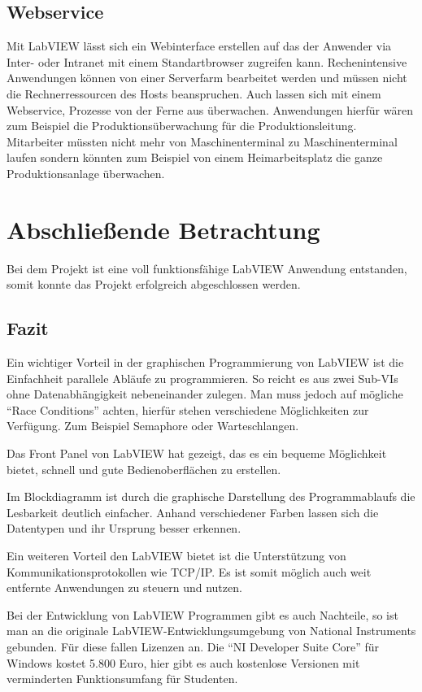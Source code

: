 \subsection{Webservice}
Mit LabVIEW lässt sich ein Webinterface erstellen auf das der Anwender via Inter- oder Intranet mit einem Standartbrowser zugreifen kann. Rechenintensive Anwendungen können von einer Serverfarm bearbeitet werden und müssen nicht die Rechnerressourcen des Hosts beanspruchen. Auch lassen sich mit einem Webservice, Prozesse von der Ferne aus überwachen. Anwendungen hierfür wären zum Beispiel die Produktionsüberwachung für die Produktionsleitung. Mitarbeiter müssten nicht mehr von Maschinenterminal zu Maschinenterminal laufen sondern könnten zum Beispiel von einem Heimarbeitsplatz die ganze Produktionsanlage überwachen.



\section{Abschließende Betrachtung}
Bei dem Projekt ist eine voll funktionsfähige LabVIEW Anwendung entstanden, somit konnte das Projekt erfolgreich abgeschlossen werden. 

\subsection{Fazit}
Ein wichtiger Vorteil in der graphischen Programmierung von LabVIEW ist die Einfachheit parallele Abläufe zu programmieren. So reicht es aus zwei Sub-VIs ohne Datenabhängigkeit nebeneinander zulegen. Man muss jedoch auf mögliche "`Race Conditions"' achten, hierfür stehen verschiedene Möglichkeiten zur Verfügung. Zum Beispiel Semaphore oder Warteschlangen. 

Das Front Panel von LabVIEW hat gezeigt, das es ein bequeme Möglichkeit bietet, schnell und gute Bedienoberflächen zu erstellen.

Im Blockdiagramm ist durch die graphische Darstellung des Programmablaufs die Lesbarkeit deutlich einfacher. Anhand verschiedener Farben lassen sich die Datentypen und ihr Ursprung besser erkennen.

Ein weiteren Vorteil den LabVIEW bietet ist die Unterstützung von Kommunikationsprotokollen wie TCP/IP. Es ist somit möglich auch weit entfernte Anwendungen zu steuern und nutzen.

Bei der Entwicklung von LabVIEW Programmen gibt es auch Nachteile, so ist man an die originale LabVIEW-Entwicklungsumgebung von National Instruments gebunden. Für diese fallen Lizenzen an. Die "`NI Developer Suite Core"' für Windows kostet 5.800 Euro, hier gibt es auch kostenlose Versionen mit verminderten Funktionsumfang für Studenten. \cite{ni-kost}

